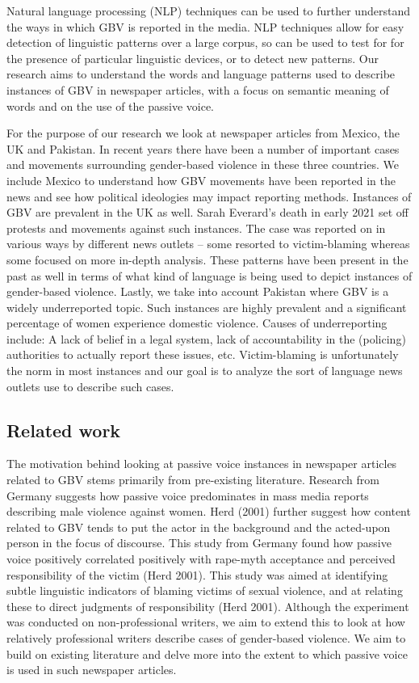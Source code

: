 \documentclass{article}
\begin{document}
{Natural language processing (NLP) techniques can be used to further understand the ways in which GBV is reported in the media. NLP techniques allow for easy detection of linguistic patterns over a large corpus, so can be used to test for for the presence of particular linguistic devices, or to detect new patterns. Our research aims to understand the words and language patterns used to describe instances of GBV in newspaper articles, with a focus on semantic meaning of words and on the use of the passive voice. 

For the purpose of our research we look at newspaper articles from Mexico, the UK and Pakistan. In recent years there have been a number of important cases and movements surrounding gender-based violence in these three countries. We include Mexico to understand how GBV movements have been reported in the news and see how political ideologies may impact reporting methods. Instances of GBV are prevalent in the UK as well. Sarah Everard's death in early 2021 set off protests and movements against such instances. The case was reported on in various ways by different news outlets – some resorted to victim-blaming whereas some focused on more in-depth analysis. These patterns have been present in the past as well in terms of what kind of language is being used to depict instances of gender-based violence. Lastly, we take into account Pakistan where GBV is a widely underreported topic. Such instances are highly prevalent and a significant percentage of women experience domestic violence. Causes of underreporting include: A lack of belief in a legal system, lack of accountability in the (policing) authorities to actually report these issues, etc. Victim-blaming is unfortunately the norm in most instances and our goal is to analyze the sort of language news outlets use to describe such cases.

\subsection{Related work}{
The motivation behind looking at passive voice instances in newspaper articles related to GBV stems primarily from pre-existing literature. Research from Germany suggests how passive voice predominates in mass media reports describing male violence against women. Herd (2001) further suggest how content related to GBV tends to put the actor in the background and the acted-upon person in the focus of discourse. This study from Germany found how passive voice positively correlated positively with rape-myth acceptance and perceived responsibility of the victim (Herd 2001). This study was aimed at identifying subtle linguistic indicators of blaming victims of sexual violence, and at relating these to direct judgments of responsibility (Herd 2001). Although the experiment was conducted on non-professional writers, we aim to extend this to look at how relatively professional writers describe cases of gender-based violence. We aim to build on existing literature and delve more into the extent to which passive voice is used in such newspaper articles.

}}
\end{document}
